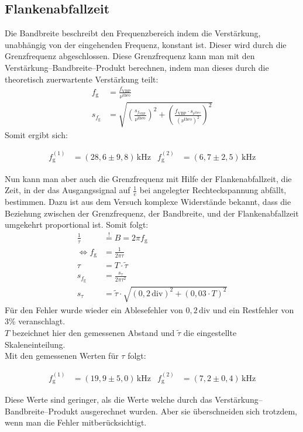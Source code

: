 \subsection{Flankenabfallzeit}
Die Bandbreite beschreibt den Frequenzbereich indem die Verstärkung, unabhängig von der eingehenden Frequenz, konstant ist.
Dieser wird durch die Grenzfrequenz abgeschlossen.
Diese Grenzfrequenz kann man mit den Verstärkung–Bandbreite–Produkt berechnen, indem man dieses durch die theoretisch zuerwartente Verstärkung teilt:
\begin{align}
    f_\text{g}&=\frac{f_\text{VBP}}{\nu^\text{theo}}\\
    s_{f_\text{g}}&=\sqrt{\left(\frac{s_{f_\text{VBP}}}{\nu^\text{theo}}\right)^2+\left(\frac{f_\text{VBP}\cdot s_{\nu^\text{theo}}}{\left(\nu^\text{theo}\right)^2}\right)^2}
\end{align}
Somit ergibt sich:
\begin{framed}
    \begin{align}
        f_\text{g}^{(1)}&=\left(28,6\pm9,8\right)\,\text{kHz} & f_\text{g}^{(2)}&=\left(6,7\pm2,5\right)\,\text{kHz}
    \end{align}
\end{framed}
Nun kann man aber auch die Grenzfrequenz mit Hilfe der Flankenabfallzeit, die Zeit, in der das Ausgangssignal auf $\frac{1}{e}$ bei angelegter Rechteckspannung abfällt, bestimmen.
Dazu ist aus dem Versuch komplexe Widerstände bekannt, dass die Beziehung zwischen der Grenzfrequenz, der Bandbreite, und der Flankenabfallzeit umgekehrt proportional ist.
Somit folgt:
\begin{align}
    \frac{1}{\tau}&\overset{!}{=}B=2\pi f_\text{g}\\
    \Leftrightarrow f_\text{g}&=\frac{1}{2\pi\tau}\\
    \tau&=T\cdot\tilde{\tau}\\
    s_{f_\text{g}}&=\frac{s_{\tau}}{2\pi\tau^2}\\
    s_\tau&=\tilde{\tau}\cdot\sqrt{\left(0,2\,\text{div}\right)^2+\left(0,03\cdot T\right)^2}
\end{align}
Für den Fehler wurde wieder ein Ablesefehler von $0,2\,\text{div}$ und ein Restfehler von 3\% veranschlagt.\\
$T$ bezeichnet hier den gemessenen Abstand und $\tilde{\tau}$ die eingestellte Skaleneinteilung.\\
Mit den gemessenen Werten für $\tau$ folgt:
\begin{framed}
    \begin{align}
        f_\text{g}^{(1)}&=\left(19,9\pm5,0\right)\,\text{kHz} & f_\text{g}^{(2)}&=\left(7,2\pm0,4\right)\,\text{kHz}
    \end{align}
\end{framed}
Diese Werte sind geringer, als die Werte welche durch das Verstärkung–Bandbreite–Produkt ausgerechnet wurden.
Aber sie überschneiden sich trotzdem, wenn man die Fehler mitberücksichtigt.
\newpage